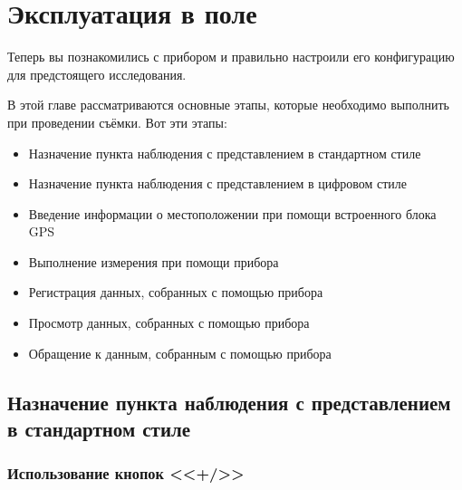 \chapter[Эксплуатация]{Эксплуатация \cg{} в поле}
\label{chap:operating_the_cg6_autograv_in_the_field}

Теперь вы познакомились с прибором \cg{} и правильно настроили его конфигурацию
для предстоящего исследования.

В этой главе рассматриваются основные этапы, которые необходимо выполнить при
проведении съёмки. Вот эти этапы:
\begin{itemize}
  \item Назначение пункта наблюдения с представлением в стандартном стиле

  \item Назначение пункта наблюдения с представлением в цифровом стиле

  \item Введение информации о местоположении при помощи встроенного блока GPS

  \item Выполнение измерения при помощи прибора \cg{}

  \item Регистрация данных, собранных с помощью прибора \cg{}

  \item Просмотр данных, собранных с помощью прибора \cg{}

  \item Обращение к данным, собранным с помощью прибора \cg{}
\end{itemize}

\section[Назначение пункта в стандартном стиле]{Назначение пункта наблюдения с представлением в стандартном стиле}



\subsection{Использование кнопок <<+/\textminus{}>>}

